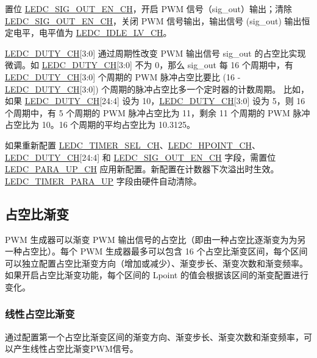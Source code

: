 \documentclass[main\_\_CN.tex]{subfiles}
\begin{document}
置位 \hyperref[fielddesc:LEDCSIGOUTENCHN]{LEDC\_SIG\_OUT\_EN\_CH}，开启 PWM 信号（sig\_out）输出；清除 \hyperref[fielddesc:LEDCSIGOUTENCHN]{LEDC\_SIG\_OUT\_EN\_CH}，关闭 PWM 信号输出，输出信号 (sig\_out) 输出恒定电平，电平值为 \hyperref[fielddesc:LEDCIDLELVCHN]{LEDC\_IDLE\_LV\_CH}。

\hyperref[fielddesc:LEDCDUTYCHN]{LEDC\_DUTY\_CH}[3:0] 通过周期性改变 PWM 输出信号 sig\_out 的占空比实现微调。如 \hyperref[fielddesc:LEDCDUTYCHN]{LEDC\_DUTY\_CH}[3:0] 不为 0，那么 sig\_out 每 16 个周期中，有 \hyperref[fielddesc:LEDCDUTYCHN]{LEDC\_DUTY\_CH}[3:0] 个周期的 PWM 脉冲占空比要比 (16 - \hyperref[fielddesc:LEDCDUTYCHN]{LEDC\_DUTY\_CH}[3:0]) 个周期的脉冲占空比多一个定时器的计数周期。
比如，如果 \hyperref[fielddesc:LEDCDUTYCHN]{LEDC\_DUTY\_CH}[24:4] 设为 10，\hyperref[fielddesc:LEDCDUTYCHN]{LEDC\_DUTY\_CH}[3:0] 设为 5，则 16 个周期中，有 5 个周期的 PWM 脉冲占空比为 11，剩余 11 个周期的 PWM 脉冲占空比为 10。16 个周期的平均占空比为 10.3125。

如果重新配置 \hyperref[fielddesc:LEDCTIMERSELCHN]{LEDC\_TIMER\_SEL\_CH}、\hyperref[fielddesc:LEDCHPOINTCHN]{LEDC\_HPOINT\_CH}、\hyperref[fielddesc:LEDCDUTYCHN]{LEDC\_DUTY\_CH}[24:4] 和 \hyperref[fielddesc:LEDCSIGOUTENCHN]{LEDC\_SIG\_OUT\_EN\_CH}
字段，需置位 \hyperref[fielddesc:LEDCPARAUPCHN]{LEDC\_PARA\_UP\_CH} 应用新配置。新配置在计数器下次溢出时生效。\hyperref[fielddesc:LEDCTIMERXPARAUP]{LEDC\_TIMER\_PARA\_UP} 字段由硬件自动清除。

\subsection{占空比渐变}

PWM 生成器可以渐变 PWM 输出信号的占空比（即由一种占空比逐渐变为为另一种占空比）。每个 PWM 生成器最多可以包含 16 个占空比渐变区间，每个区间可以独立配置占空比渐变方向（增加或减少）、渐变步长、渐变次数和渐变频率。如果开启占空比渐变功能，每个区间的 Lpoint 的值会根据该区间的渐变配置进行变化。

\subsubsection{线性占空比渐变}
\label{sec:ledc-pwm-linear-duty-cycle-fading}

通过配置第一个占空比渐变区间的渐变方向、渐变步长、渐变次数和渐变频率，可以产生线性占空比渐变PWM信号。
\end{document}
